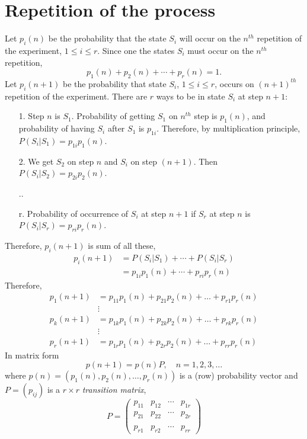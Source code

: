 \section{Repetition of the process}

Let $p_i(n)$ be the probability that the state $S_i$ will occur on the $n^{th}$ repetition of the experiment, $1\leq i\leq r$. 
Since one the states $S_i$ must occur on the $n^{th}$ repetition,
\[
p_1(n)+p_2(n)+\cdots+p_r(n)=1.
\]
Let $p_i(n+1)$ be the probability that state $S_i$, $1\leq i\leq r$, occurs on $(n+1)^{th}$ repetition of the experiment. 
There are $r$ ways to be in state $S_i$ at step $n+1$:
\begin{enumerate}
\item[1.] Step $n$ is $S_1$. Probability of getting $S_1$ on $n^{th}$ step is $p_1(n)$, and probability of having $S_i$ after $S_1$ is $p_{1i}$. Therefore, by multiplication principle, $P(S_i|S_1)=p_{1i}p_1(n)$. 
\item[2.] We get $S_2$ on step $n$ and $S_i$ on step $(n+1)$. Then $P(S_i|S_2)=p_{2i}p_2(n)$. 
\item[..]
\item[r.] Probability of occurrence of $S_i$ at step $n+1$ if $S_r$ at step $n$ is $P(S_i|S_r)=p_{ri}p_r(n)$.
\end{enumerate}
Therefore, $p_i(n+1)$ is sum of all these,
\begin{align*}
p_i(n+1) &= P(S_i|S_1)+\cdots+P(S_i|S_r) \\
&= p_{1i}p_1(n)+\cdots+p_{ri}p_r(n)
\end{align*}
Therefore,
\begin{equation}\label{eq:chain1}
\begin{aligned}
p_1(n+1) &= p_{11}p_1(n)+p_{21}p_2(n)+\dots+p_{r1}p_r(n) \\
& \vdots\\
p_k(n+1) &= p_{1k}p_1(n)+p_{2k}p_2(n)+\dots+p_{rk}p_r(n) \\
& \vdots\\
p_r(n+1) &= p_{1r}p_1(n)+p_{2r}p_2(n)+\dots+p_{rr}p_r(n)
\end{aligned}
\end{equation}
In matrix form
\begin{equation}
p(n+1)=p(n)P, \quad n=1,2,3,\dots
\end{equation}
where $p(n)=(p_1(n),p_{2}(n),\dots , p_r(n))$ is a (row) probability vector and $P=(p_{ij})$ is a $r\times r$ \emph{transition matrix},
\[
P=
\begin{pmatrix}
p_{11} & p_{12} & \cdots & p_{1r} \\
p_{21} & p_{22} & \cdots & p_{2r} \\
&&& \\
p_{r1} & p_{r2} & \cdots & p_{rr}
\end{pmatrix}
\]
